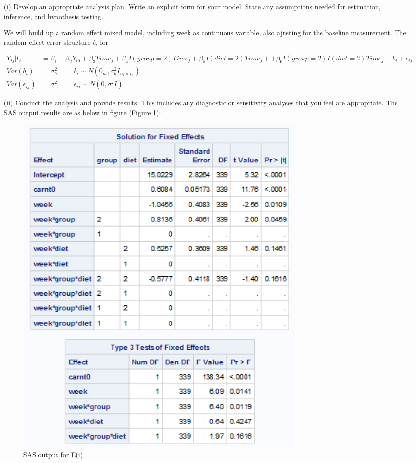 \begin{itemize}
													\begin{itemize}
													\vspace{0.2cm}
													\item[(i)] Develop an appropriate analysis plan. Write an explicit form for your model.
																		 State any assumptions needed for estimation, inference, and hypothesis testing.

We will build up a random effect mixed model, including week as continuous variable, also ajusting for the baseline measurement. The random effect error structure $b_i$ for 

\begin{align*}
Y_{ij} | b_i &=\beta_1 +  \beta_{2} Y_{i0}  + \beta_{3} Time_{j} + \beta_{4} I(group=2) Time_{j}  + \beta_{5} I(diet=2) Time_{j} + + \beta_{6} I(group=2) I(diet=2)Time_{j}  + b_i + \epsilon_{ij} \\
Var(b_i) &= \sigma_b^2, \qquad b_i \sim N(0_{n_i}, \sigma_b^2I_{n_i \times n_i}) \\
Var(\epsilon_{ij}) &= \sigma^2 , \qquad \epsilon_{ij} \sim N(0, \sigma^2 I)
\end{align*}

	
													\vspace{0.2cm}
												  \item[(ii)] Conduct the analysis and provide results.	This includes any diagnostic or sensitivity analyses
																			that you feel are appropriate.
The SAS output results are as below in figure (Figure \ref{fig:e1}):
\begin{figure}[h]
    \centering
    \includegraphics[scale=1]{HW4/img/e1.png}
    \caption{SAS output for E(i)}
\label{fig:e1}
\end{figure}


\end{itemize}
\end{itemize}
